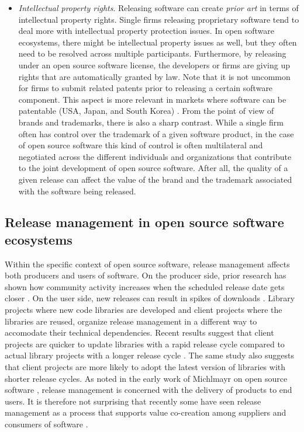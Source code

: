 \documentclass[dvipsnames]{interact}
\theoremstyle{plain}\newtheorem{theorem}{Theorem}[section]
\theoremstyle{definition}
\theoremstyle{remark}
\newenvironment{newStuff}{
    \begin{color}{Sepia}
    \begin{tabular}{|p{1.0\textwidth}|}
    \hline\\
    }
    { 
    \\\\\hline
    \end{tabular} 
    \end{color}
    }
\renewenvironment{newStuff}{}{}
\begin{document}
\begin{itemize}
 \item \textit{Intellectual property rights}. Releasing software can create \textit{prior art} in terms of intellectual property rights. Single firms releasing proprietary software tend to deal more with intellectual property protection issues. In open software ecosystems, there might be intellectual property issues as well, but they often need to be resolved across multiple participants. Furthermore, by releasing under an open source software license, the developers or firms are giving up rights that are automatically granted by law. Note that it is not uncommon for firms to submit related patents prior to releasing a certain software component. This aspect is more relevant in markets where software can be patentable (USA, Japan, and South Korea) \citep{HallMacGarvie2010}. From the point of view of brands and trademarks, there is also a sharp contrast. While a single firm often has control over the trademark of a given software product, in the case of open source software this kind of control is often multilateral and negotiated across the different individuals and organizations that contribute to the joint development of open source software. After all, the quality of a given release can affect the value of the brand and the trademark associated with the software being released.  


\end{itemize}


\subsection{Release management in open source software ecosystems}
 

Within the specific context of open source software, release management affects both producers and users of software. On the producer side, prior research has shown how community activity increases when the scheduled release date gets closer \citep{RossiRusso_et_al2009}. On the user side, new releases can result in spikes of downloads \citep{WigginsHowison_et_al2009}. \begin{newStuff}Library projects where new code libraries are developed and client projects where the libraries are reused, organize release management in a different way to accomodate their technical dependencies.\end{newStuff} Recent results  suggest that client projects are quicker to update libraries with a rapid release cycle compared to actual library projects with a longer release cycle \citep{IharaFujibayashi_et_al2017}.  The same study also suggests that client projects are more likely to adopt the latest version of libraries with shorter release cycles.
As noted in the early work of Michlmayr on open source software \citep{Michlmayr2007}, release management is concerned with the delivery of products to end users. It is therefore not surprising that recently some have seen release management as a process that supports value co-creation among suppliers and consumers of software \citep{ClevelandEllis2014,BarqawiSyed_et_al2016}. 
\end{document}
